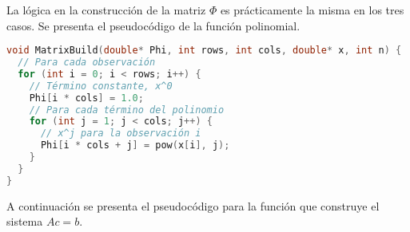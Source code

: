 \documentclass{article}
\begin{document}
La lógica en la construcción de la matriz $\Phi$ es prácticamente la misma en los tres casos. Se presenta el pseudocódigo de la función polinomial.

\begin{lstlisting}[language=C, caption={Construcción de la matriz Phi para ajuste polinomial.}]
void MatrixBuild(double* Phi, int rows, int cols, double* x, int n) {
  // Para cada observación
  for (int i = 0; i < rows; i++) { 
    // Término constante, x^0
    Phi[i * cols] = 1.0;
    // Para cada término del polinomio
    for (int j = 1; j < cols; j++) { 
      // x^j para la observación i
      Phi[i * cols + j] = pow(x[i], j); 
    }
  }
}
\end{lstlisting}

A continuación se presenta el pseudocódigo para la función que construye el sistema $Ac = b$.
\end{document}
